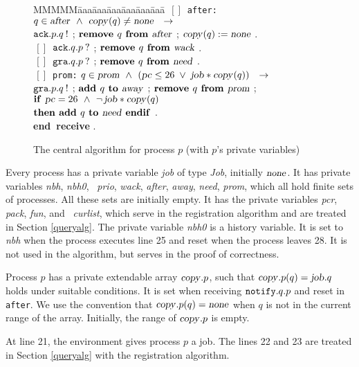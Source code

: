 \documentclass[10pt]{article} \usepackage[english]{babel}
\newenvironment{tab}{\begin{tabbing}
MMMMM\=aaa\=aaa\=aaa\=aaa\=aaa\=aaa\= \kill}{\end{tabbing}}
\def\bar   {\mbox{$\,[ \! ]\,$}}
\def\S #1/{\mbox {\textsl{#1}}}
\def\B #1/{\mbox {\textbf{#1}}}
\def\T #1/{\mbox {\texttt{#1}}}
\def\Land   {\mbox{ $\;\land\;$ }}
\def\Lor    {\;\lor\;}
\def\TO     {\mbox{$\quad\to\quad$}}
\begin{document}
\begin{figure}[t]
\begin{tab}
  $ \bar $ \> \T after:/ \quad $ q\in\S after/\Land \S copy/(q)\ne\S none/\TO$\\
  \> $ \T ack/.p.q \:! $ ; 
  $ \B remove /q\B\ from /\S after/$ ; $ \S copy/(q):=\S none/ $ . \\

  $ \bar $\> $  \T ack/.q.p \:? $ ;
  $ \B remove /q\B\ from /\S wack/ $ . \\

  $ \bar $\> $  \T gra/.q.p\: ? $ ; $ \B remove /q \B\ from /\S need/ $ .\\
 
  $\bar$ \> \T prom:/ \quad $ q\in\S prom/\Land (\S pc/ \leq 26
  \Lor \S job/*\S copy/(q)) \TO $ \\
  \> $ \T gra/.p.q\: ! $ ; $ \B add /q\B\ to /\S away/ $ ;
  $ \B remove /q\B\ from /\S prom/ $ ;\\
  \> $ \B if / \S pc/ = 26 \Land  \neg\, \S job/*\S copy/(q) $\\
  \> $ \B then /\B add /q\B\ to /\S need/\B\ endif/ $ .\-\\
  \B end receive/ .
\end{tab}
\caption{The central algorithm for process $p$ (with $p$'s private
  variables)}\label{fifo}
\end{figure}

Every process has a private variable \S job/ of type \S Job/,
initially $\S none/$. It has private variables \S nbh/, \S nbh0/, \S
prio/, \S wack/, \S after/, \S away/, \S need/, \S prom/, which all
hold finite sets of processes.  All these sets are initially empty.
It has the private variables \S pcr/, \S pack/, \S fun/, and \S
curlist/, which serve in the registration algorithm and are treated in
Section \ref{queryalg}.  The private variable \S nbh0/ is a history
variable.  It is set to \S nbh/ when the process executes line 25 and
reset when the process leaves 28. It is not used in the algorithm, but
serves in the proof of correctness.

Process $p$ has a private extendable array $\S copy/.p$, such that $\S copy/.p(q)=\S job/.q$ holds under suitable
conditions.  It is set when receiving $\T notify/.q.p$ and reset in \T
after/.  We use the convention that $\S copy/.p(q) = \S none/ $ when
$q$ is not in the current range of the array. Initially, the range of
$\S copy/.p$ is empty.

At line 21, the environment gives process $p$ a job.  The lines 22 and
23 are treated in Section \ref{queryalg} with the registration
algorithm.
\end{document}
